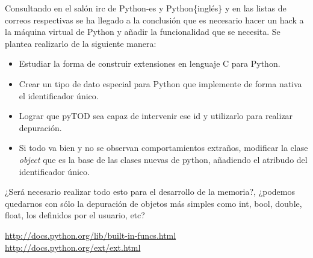 \documentclass[10pt,a4paper]{article}
\begin{document}
Consultando en el salón irc de Python-es y Python\{inglés\} y en las listas de correos respectivas se ha llegado a la conclusión que es necesario hacer un hack a la máquina virtual de Python y añadir la funcionalidad que se necesita.  Se plantea realizarlo de la siguiente manera:
\begin{itemize}
\item Estudiar la forma de construir extensiones en lenguaje C para Python\cite{howto}.
\item Crear un tipo de dato especial para Python que implemente de forma nativa el identificador único.
\item Lograr que pyTOD sea capaz de intervenir ese id y utilizarlo para realizar depuración.
\item Si todo va bien y no se observan comportamientos extraños, modificar la clase \textit{object} que es la base de las clases nuevas de python, añadiendo el atribudo del identificador único.
\end{itemize}

¿Será necesario realizar todo esto para el desarrollo de la memoria?, ¿podemos quedarnos con sólo la depuración de objetos más simples como int, bool, double, float, los definidos por el usuario, etc?


\newpage
\begin{thebibliography}{2}
 \url{http://docs.python.org/lib/built-in-funcs.html}
 \url{http://docs.python.org/ext/ext.html}
\end{thebibliography}
\end{document}
